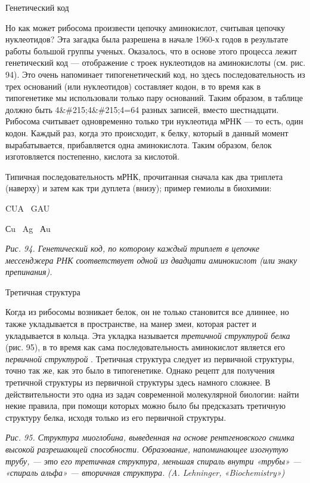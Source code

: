 \documentclass[../main.tex]{subfiles}
\begin{document}
Генетический код

Но как может рибосома произвести цепочку аминокислот, считывая цепочку нуклеотидов? Эта загадка была разрешена в начале 1960-х годов в результате работы большой группы ученых. Оказалось, что в основе этого процесса лежит генетический код --- отображение с троек нуклеотидов на аминокислоты (см. рис. 94). Это очень напоминает типогенетический код, но здесь последовательность из трех оснований (или нуклеотидов) составляет кодон, в то время как в типогенетике мы использовали только пару оснований. Таким образом, в таблице должно быть 4\&\#215;4\&\#215;4=64 разных записей, вместо шестнадцати. Рибосома считывает одновременно только три нуклеотида мРНК --- то есть, один кодон. Каждый раз, когда это происходит, к белку, который в данный момент вырабатывается, прибавляется одна аминокислота. Таким образом, белок изготовляется постепенно, кислота за кислотой.

Типичная последовательность мРНК, прочитанная сначала как два триплета (наверху) и затем как три дуплета (внизу); пример гемиолы в биохимии:

CUA ~GAU

Сu ~Ag ~Аu

\emph{Рис. 94. Генетический код, по которому каждый триплет в цепочке мессенджера РНК соответствует одной из двадцати аминокислот (или знаку препинания).}

Третичная структура

Когда из рибосомы возникает белок, он не только становится все длиннее, но также укладывается в пространстве, на манер змеи, которая растет и укладывается в кольца. Эта укладка называется \emph{третичной структурой белка} (рис. 95), в то время как сама последовательность аминокислот является его \emph{первичной структурой} . Третичная структура следует из первичной структуры, точно так же, как это было в типогенетике. Однако рецепт для получения третичной структуры из первичной структуры здесь намного сложнее. В действительности это одна из задач современной молекулярной биологии: найти некие правила, при помощи которых можно было бы предсказать третичную структуру белка, исходя только из его первичной структуры.

\emph{Рис. 95. Структура миоглобина, выведенная на основе рентгеновского снимка высокой разрешающей способности. Образование, напоминающее изогнутую трубу, --- это его третичная структура, меньшая спираль внутри «трубы» --- «спираль альфа» --- вторичная структура. (A. Lehninger, «Biochemistry»)}
\end{document}
